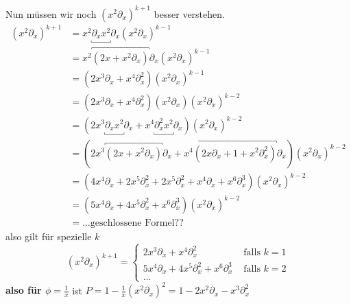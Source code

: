 Nun müssen wir noch $(x^2\partial_x)^{k+1}$ besser verstehen.
\begin{align*}
(x^2\partial_x)^{k+1} &=x^2\underbracket{\partial_xx^2}\partial_x
                        (x^2\partial_x)^{k-1}\\
                      &=x^2\overbracket{(2x+x^{2}\partial_x)}\partial_x
                        (x^2\partial_x)^{k-1}\\
                      &=(2x^3\partial_x+x^{4}\partial_x^2)
                        (x^2\partial_x)^{k-1}\\
                      &=(2x^3\partial_x+x^{4}\partial_x^2)(x^2\partial_x)
                        (x^2\partial_x)^{k-2}\\
                      &=(2x^3\underbracket{\partial_xx^2}\partial_x
                        +x^{4}\underbracket{\partial_x^2x^2}\partial_x)
                        (x^2\partial_x)^{k-2}\\
                      &=(2x^3\overbracket{(2x+x^{2}\partial_x)}\partial_x
                        +x^{4}\overbracket{(2x\partial_x+1+x^2\partial_x^2)}
                        \partial_x) (x^2\partial_x)^{k-2}\\
                      &=(4x^4\partial_x+2x^{5}\partial_x^2
                        +2x^{5}\partial_x^2
                        +x^4\partial_x
                        +x^6\partial_x^3)
                        (x^2\partial_x)^{k-2}\\
                      &=(5x^4\partial_x+4x^{5}\partial_x^2
                        +x^6\partial_x^3)
                        (x^2\partial_x)^{k-2}\\
                      &=\dots \mbox{geschlossene Formel??}
\end{align*}
also gilt für spezielle $k$
\[
(x^2\partial_x)^{k+1}=
\begin{cases}
2x^3\partial_x+x^{4}\partial_x^2 & \mbox{ falls } k=1\\
5x^4\partial_x+4x^{5}\partial_x^2 +x^6\partial_x^3 & \mbox{ falls } k=2\\
\dots
\end{cases}
\]
\textbf{also für $\phi=\frac{1}{x}$} ist 
$P=1-\frac{1}{x}(x^2\partial_x)^{2}=1-2x^2\partial_x-x^{3}\partial_x^2$
\begin{center}
\end{center}

